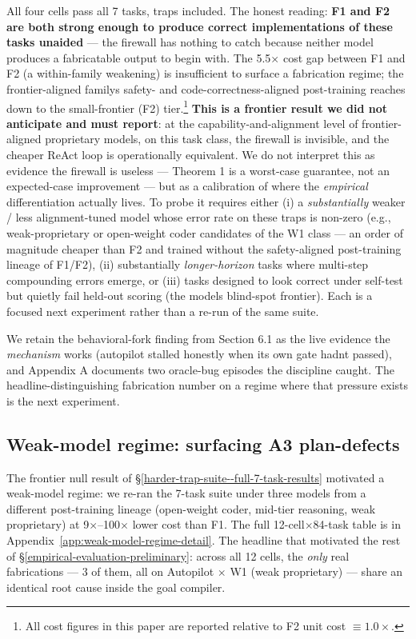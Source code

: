 All four cells pass all 7 tasks, traps included. The honest reading: \textbf{F1 and F2
are both strong enough to produce correct implementations of these tasks unaided} --- the firewall
has nothing to catch because neither model produces a fabricatable output to begin with. The 5.5×
cost gap between F1 and F2 (a within-family weakening) is insufficient to surface a
fabrication regime; the frontier-aligned family\textquotesingle s safety- and code-correctness-aligned post-training reaches
down to the small-frontier (F2) tier.\footnote{All cost figures in this paper are reported relative to F2 unit cost
$\equiv 1.0\times$.} \textbf{This is a frontier result we did not anticipate and must report}: at the
capability-and-alignment level of frontier-aligned proprietary models, on this task class, the firewall
is invisible, and the cheaper ReAct loop is operationally equivalent. We do not interpret this as
evidence the firewall is useless --- Theorem 1 is a worst-case guarantee, not an expected-case
improvement --- but as a calibration of where the \emph{empirical} differentiation actually lives. To
probe it requires either (i) a \emph{substantially} weaker / less alignment-tuned model whose error rate
on these traps is non-zero (e.g., weak-proprietary or open-weight coder candidates of the W1 class --- an
order of magnitude cheaper than F2 and trained without the safety-aligned post-training lineage of
F1/F2), (ii) substantially \emph{longer-horizon} tasks where multi-step compounding errors
emerge, or (iii) tasks designed to look correct under self-test but quietly fail held-out scoring
(the model\textquotesingle s blind-spot frontier). Each is a focused next experiment rather than a re-run of the
same suite.

We retain the behavioral-fork finding from Section 6.1 as the live evidence the \emph{mechanism} works
(autopilot stalled honestly when its own gate hadn\textquotesingle t passed), and Appendix A documents two oracle-bug
episodes the discipline caught. The headline-distinguishing fabrication number on a regime where
that pressure exists is the next experiment.

\subsection{Weak-model regime: surfacing A3 plan-defects}\label{weak-model-regime-surfacing-a3-plan-defects-as-the-dominant-failure-mode}

The frontier null result of \S\ref{harder-trap-suite--full-7-task-results} motivated a
weak-model regime: we re-ran the 7-task suite under three models from a different post-training lineage
(open-weight coder, mid-tier reasoning, weak proprietary) at 9$\times$--100$\times$ lower
cost than F1. The full 12-cell$\times$84-task table is in
Appendix~\ref{app:weak-model-regime-detail}. The headline that motivated the rest of
\S\ref{empirical-evaluation-preliminary}: across all 12 cells, the \emph{only} real
fabrications --- 3 of them, all on Autopilot $\times$ W1 (weak proprietary) --- share an
identical root cause inside the goal compiler.

